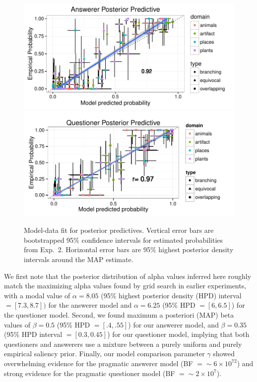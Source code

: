 \documentclass[12pt, floatsintext, jou]{apa6}
\begin{document}
\begin{figure}[t!]
\begin{center}
\includegraphics[scale=1]{AnswererPredictive.pdf}
\includegraphics[scale=1]{QuestionerPredictive.pdf}
\end{center}
\caption{Model-data fit for posterior predictives. Vertical error bars are bootstrapped 95\% confidence intervals for estimated probabilities from Exp.~2. Horizontal error bars are 95\% highest posterior density intervals around the MAP estimate.}
\label{fig:posteriorPredictives}
\end{figure}

We first note that the posterior distribution of alpha values inferred here roughly match the maximizing alpha values found by grid search in earlier experiments, with a modal value of $\alpha = 8.05$ (95\% highest posterior density (HPD) interval $=[7.3, 8.7])$ for the answerer model and $\alpha = 6.25$ (95\% HPD $=[6, 6.5]$) for the questioner model. Second, we found maximum a posteriori (MAP) beta values of $\beta = 0.5$ (95\% HPD $=[.4, .55]$) for our answerer model, and $\beta = 0.35$ (95\% HPD interval $= [0.3, 0.45]$) for our questioner model, implying that both questioners and answerers use a mixture between a purely uniform and purely empirical saliency prior. Finally, our model comparison parameter $\gamma$ showed overwhelming evidence for the pragmatic answerer model (BF $= \sim6 \times 10^{72}$) and strong evidence for the pragmatic questioner model (BF $= \sim2\times 10^{7}$).
\end{document}
